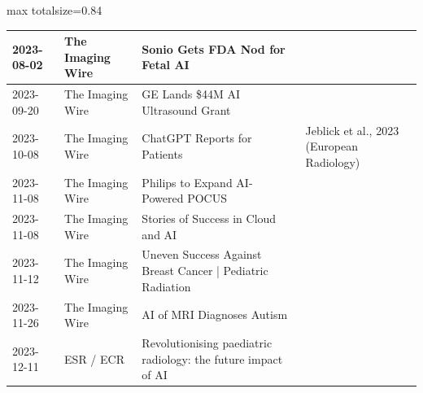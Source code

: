 \documentclass[aspectratio=169]{beamer}
\begin{document}
\begin{frame}
\begin{adjustbox}{max totalsize={\textwidth}{0.84\textheight}}
\begin{tabular}{|l|l|>{\raggedright\arraybackslash}p{}|>{\raggedright\arraybackslash}p{}|}
2023-08-02 & The Imaging Wire & Sonio Gets FDA Nod for Fetal AI &  \\ \hline
2023-09-20 & The Imaging Wire & GE Lands \$44M AI Ultrasound Grant &  \\ \hline
2023-10-08 & The Imaging Wire & ChatGPT Reports for Patients & Jeblick et al., 2023 (European Radiology) \\ \hline
2023-11-08 & The Imaging Wire & Philips to Expand AI-Powered POCUS &  \\ \hline
2023-11-08 & The Imaging Wire & Stories of Success in Cloud and AI &  \\ \hline
2023-11-12 & The Imaging Wire & Uneven Success Against Breast Cancer | Pediatric Radiation &  \\ \hline
2023-11-26 & The Imaging Wire & AI of MRI Diagnoses Autism &  \\ \hline
2023-12-11 & ESR / ECR & Revolutionising paediatric radiology: the future impact of AI &  \\ \hline
\end{tabular}
\end{adjustbox}
\end{frame}
\end{document}
